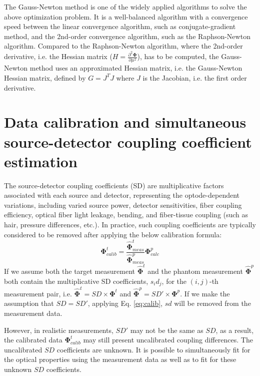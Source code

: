 \documentclass[12pt]{book}               %
\begin{document}
The Gauss-Newton method is one of the widely applied algorithms to solve the above optimization problem. It is a well-balanced algorithm with a convergence speed between the linear convergence algorithm, such as conjugate-gradient method, and the 2nd-order convergence algorithm, such as the Raphson-Newton algorithm. Compared to the Raphson-Newton algorithm, where the 2nd-order derivative, i.e. the Hessian matrix ($H=\frac{\partial^2 \mathbf\Phi}{\partial\mu^2}$), has to be computed, the Gauss-Newton method uses an approximated Hessian matrix, i.e. the Gauss-Newton Hessian matrix, defined by $G=J^TJ$ where $J$ is the Jacobian, i.e. the first order derivative.


\section{Data calibration and simultaneous source-detector coupling coefficient estimation}
The source-detector coupling coefficients (SD) are multiplicative factors associated with each source and detector, representing the optode-dependent variations, including varied source power, detector sensitivities, fiber coupling efficiency, optical fiber light leakage, bending, and fiber-tissue coupling (such as hair, pressure differences, etc.). In practice, such coupling coefficients are typically considered to be removed after applying the below calibration formula:
\begin{equation}\label{eq:calib}
\mathbf{\Phi}^{t}_{calib}=\frac{\hat{\mathbf{\Phi}}^{t}_{meas}}{\hat{\mathbf{\Phi}}^{p}_{meas}}\mathbf{\Phi}_{calc}^{p}
\end{equation}
If we assume both the target measurement $\hat{\mathbf{\Phi}}^{t}$ and the phantom measurement $\hat{\mathbf{\Phi}}^{p}$ both contain the multiplicative SD coefficients, $s_id_j$, for the $(i,j)$-th measurement pair, i.e. $\hat{\mathbf{\Phi}}^{t}=SD\times\mathbf{\Phi}^{t}$ and $\hat{\mathbf{\Phi}}^{p}=SD'\times\mathbf{\Phi}^{p}$. If we make the assumption that $SD=SD'$, applying Eq. \ref{eq:calib}, $sd$ will be removed from the measurement data.

However, in realistic measurements, $SD'$ may not be the same as $SD$, as a result, the calibrated data $\mathbf{\Phi}^{t}_{calib}$ may still present uncalibrated coupling differences. The uncalibrated $SD$ coefficients are unknown. It is possible to simultaneously fit for the optical properties using the measurement data as well as to fit for these unknown $SD$ coefficients.
\end{document}
